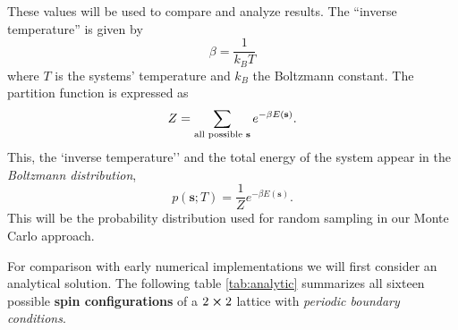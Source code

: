 \documentclass[english,notitlepage,reprint,nofootinbib]{revtex4-1}  %
\begin{document}
These values will be used to compare and analyze results. The ``inverse temperature'' is given by
\begin{equation}
    \beta = \frac{1}{k_B T}
\end{equation}
where $T$ is the systems' temperature and $k_B$ the Boltzmann constant. The partition function is expressed as
\begin{equation}
    Z = \sum_{\text{all possible \textbf{s}}} e^{- \beta E(\textbf{s})}.
\end{equation}
This, the `inverse temperature'' and the total energy of the system appear in the \textit{Boltzmann distribution},
\begin{equation}
    p(\textbf{s};T) = \frac{1}{Z} e^{-\beta E(\textbf{s})}.\label{eq:prob_dist}
\end{equation}
This will be the probability distribution used for random sampling in our Monte Carlo approach.


For comparison with early numerical implementations we will first consider an analytical solution. The following table \ref{tab:analytic} summarizes all sixteen possible \textbf{spin configurations} of a $2 \cross 2$ lattice with \textit{periodic boundary conditions}.
\end{document}
